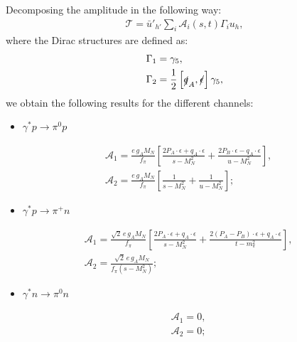 \documentclass[11pt,preprint,tightenlines,
showpacs,preprintnumbers,amsmath,amssymb,superscriptaddress,a4paper,nofootinbib]{revtex4-1}
\begin{document}
Decomposing the amplitude in the following way:
\begin{align}\label{Eq:T-decomposition}
\mathcal{T}= \bar{u}'_{h'} \sum_{i}  \mathcal{A}_i (s,t) \Gamma_i u_h,
\end{align}
where the Dirac structures are defined as:
\begin{align}\label{Eq:DefGammas}
  \Gamma_1&= \gamma_5, \\
  \Gamma_2&= \frac{1}{2}\left[\slashed{q}_A,\slashed{\epsilon}\right]\gamma_5,  
\end{align}
we obtain the following results for the different channels:
\begin{itemize}
 \item $\gamma^* p \to \pi^0 p$
\end{itemize}
\begin{align}
  &\mathcal{A}_1= \frac{e\, g_A M_N}{f_\pi}\left[\frac{2 P_A\cdot \epsilon + q_A\cdot \epsilon}{s-M_N^2} + \frac{2 P_B\cdot \epsilon - q_A\cdot \epsilon}{u-M_N^2}\right], \\
   &\mathcal{A}_2=\frac{e\, g_A M_N}{f_\pi}\left[\frac{1}{s-M_N^2} + \frac{1}{u-M_N^2}\right];
\end{align}


\begin{itemize}
 \item $\gamma^* p \to \pi^+ n$
\end{itemize}
\begin{align}
  &\mathcal{A}_1= \frac{\sqrt{2}\, e\, g_A M_N}{f_\pi}\left[\frac{2 P_A\cdot \epsilon + q_A\cdot \epsilon}{s-M_N^2} + \frac{2 (P_A - P_B)\cdot \epsilon + q_A\cdot \epsilon}{t-m_\pi^2}\right],\\
   &\mathcal{A}_2=\frac{\sqrt{2}\, e\, g_A M_N}{f_\pi(s-M_N^2)};
\end{align}


\begin{itemize}
 \item $\gamma^* n \to \pi^0 n$
\end{itemize}
\begin{align}
  &\mathcal{A}_1= 0,\\
  & \mathcal{A}_2=0;
\end{align}
\end{document}
